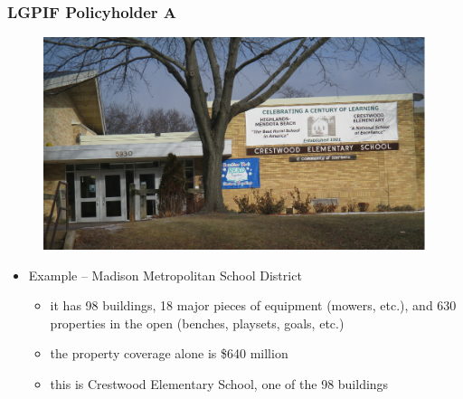 \documentclass[serif,10pt]{beamer}
\begin{document}
\begin{frame}%
\frametitle{LGPIF Policyholder A}
\begin{figure}[htp]
  \begin{center}
\includegraphics[scale = 0.075, bb = 300 300 300 300]{Figures/CrestwoodADec2014.JPG}
  \end{center}
\end{figure}

\vspace{0.2in}

  \begin{itemize}
\item Example --  Madison Metropolitan School District
  \begin{itemize}
\item it has 98 buildings, 18 major pieces of equipment (mowers, etc.), and 630 properties in the open (benches, playsets, goals,
etc.) \vspace{2mm}
\item the property coverage alone is \$640 million \vspace{2mm}
\item this is Crestwood Elementary School, one of the 98 buildings
\end{itemize}\end{itemize}
\end{frame}
\end{document}
